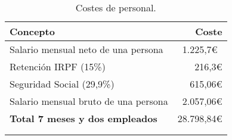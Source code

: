 \begin{longtable}[]{@{}lr@{}}
	\toprule
	\begin{minipage}[b]{0.60\columnwidth}\raggedright\strut
		\textbf{Concepto}\strut
	\end{minipage} & \begin{minipage}[b]{0.20\columnwidth}\raggedright\strut
		\textbf{Coste}\strut
	\end{minipage}\tabularnewline
	\midrule
	\endhead
	\begin{minipage}[t]{0.60\columnwidth}\raggedright\strut
		Salario mensual neto de una persona\strut
	\end{minipage} & \begin{minipage}[t]{0.20\columnwidth}\raggedright\strut
		1.225,7\euro{}~\cite{salariales}\strut
	\end{minipage}\tabularnewline
	\begin{minipage}[t]{0.60\columnwidth}\raggedright\strut
		Retención IRPF (15\%)\strut
	\end{minipage} & \begin{minipage}[t]{0.20\columnwidth}\raggedright\strut
		216,3\euro{}\strut
	\end{minipage}\tabularnewline
	\begin{minipage}[t]{0.60\columnwidth}\raggedright\strut
		Seguridad Social (29,9\%)\strut
	\end{minipage} & \begin{minipage}[t]{0.20\columnwidth}\raggedright\strut
		615,06\euro{}\strut
	\end{minipage}\tabularnewline
	\begin{minipage}[t]{0.60\columnwidth}\raggedright\strut
		Salario mensual bruto de una persona\strut
	\end{minipage} & \begin{minipage}[t]{0.20\columnwidth}\raggedright\strut
		2.057,06\euro{}\strut
	\end{minipage}\tabularnewline
	\midrule
	\begin{minipage}[t]{0.60\columnwidth}\raggedright\strut
		\textbf{Total 7 meses y dos empleados}\strut
	\end{minipage} & \begin{minipage}[t]{0.20\columnwidth}\raggedright\strut
		28.798,84\euro{}\strut
	\end{minipage}\tabularnewline
	\bottomrule
	\\
	\caption{Costes de personal.}
\end{longtable}

